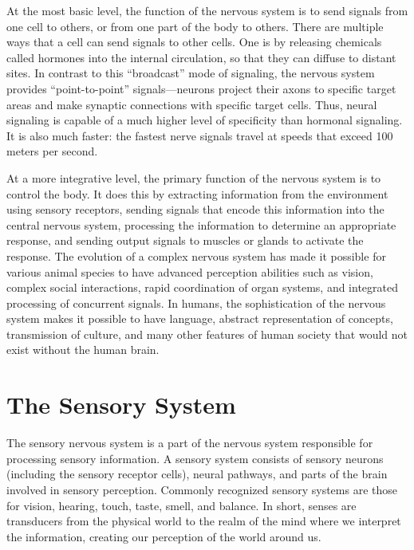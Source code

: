 \documentclass[]{book}
\begin{document}
At the most basic level, the function of the nervous system is to send signals from one cell to others, or from one part of the body to others. There are multiple ways that a cell can send signals to other cells. One is by releasing chemicals called hormones into the internal circulation, so that they can diffuse to distant sites. In contrast to this ``broadcast'' mode of signaling, the nervous system provides ``point-to-point'' signals---neurons project their axons to specific target areas and make synaptic connections with specific target cells. Thus, neural signaling is capable of a much higher level of specificity than hormonal signaling. It is also much faster: the fastest nerve signals travel at speeds that exceed 100 meters per second.

At a more integrative level, the primary function of the nervous system is to control the body. It does this by extracting information from the environment using sensory receptors, sending signals that encode this information into the central nervous system, processing the information to determine an appropriate response, and sending output signals to muscles or glands to activate the response. The evolution of a complex nervous system has made it possible for various animal species to have advanced perception abilities such as vision, complex social interactions, rapid coordination of organ systems, and integrated processing of concurrent signals. In humans, the sophistication of the nervous system makes it possible to have language, abstract representation of concepts, transmission of culture, and many other features of human society that would not exist without the human brain.

\hypertarget{the-sensory-system}{%
\section{The Sensory System}\label{the-sensory-system}}

The sensory nervous system is a part of the nervous system responsible for processing sensory information. A sensory system consists of sensory neurons (including the sensory receptor cells), neural pathways, and parts of the brain involved in sensory perception. Commonly recognized sensory systems are those for vision, hearing, touch, taste, smell, and balance. In short, senses are transducers from the physical world to the realm of the mind where we interpret the information, creating our perception of the world around us.
\end{document}
